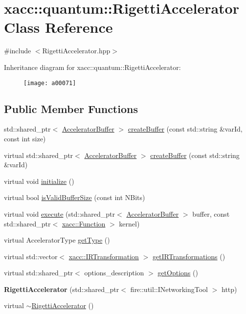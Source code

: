 \hypertarget{a00071}{}\section{xacc\+:\+:quantum\+:\+:Rigetti\+Accelerator Class Reference}
\label{a00071}


{\ttfamily \#include $<$Rigetti\+Accelerator.\+hpp$>$}

Inheritance diagram for xacc\+:\+:quantum\+:\+:Rigetti\+Accelerator\+:\begin{figure}[H]
\begin{center}
\leavevmode
\texttt{[image: a00071]}
\end{center}
\end{figure}
\subsection*{Public Member Functions}
\begin{DoxyCompactItemize}
\item 
std\+::shared\+\_\+ptr$<$ \hyperlink{a00013}{Accelerator\+Buffer} $>$ \hyperlink{a00071_a731551c94b1abef40d2cf032e8712df6}{create\+Buffer} (const std\+::string \&var\+Id, const int size)
\item 
virtual std\+::shared\+\_\+ptr$<$ \hyperlink{a00013}{Accelerator\+Buffer} $>$ \hyperlink{a00071_ada3ceb986e51ab5aa721f2a08e083cd6}{create\+Buffer} (const std\+::string \&var\+Id)
\item 
virtual void \hyperlink{a00071_ab8b6af9bb9dcb110201e9ee5cac74b4f}{initialize} ()
\item 
virtual bool \hyperlink{a00071_a61352c07062597aad2393fbeed4cc025}{is\+Valid\+Buffer\+Size} (const int N\+Bits)
\item 
virtual void \hyperlink{a00071_afce7bbd1b0f04300a9920952e9d12ef4}{execute} (std\+::shared\+\_\+ptr$<$ \hyperlink{a00013}{Accelerator\+Buffer} $>$ buffer, const std\+::shared\+\_\+ptr$<$ \hyperlink{a00038}{xacc\+::\+Function} $>$ kernel)
\item 
virtual Accelerator\+Type \hyperlink{a00071_aab0d4674da5273d55407b9ab77cde890}{get\+Type} ()
\item 
virtual std\+::vector$<$ \hyperlink{a00051}{xacc\+::\+I\+R\+Transformation} $>$ \hyperlink{a00071_a443683a1dfb000603c640b2ee303cf66}{get\+I\+R\+Transformations} ()
\item 
virtual std\+::shared\+\_\+ptr$<$ options\+\_\+description $>$ \hyperlink{a00071_a9ee9e62aecbccf193894ca3388676f9f}{get\+Options} ()
\item 
{\bfseries Rigetti\+Accelerator} (std\+::shared\+\_\+ptr$<$ fire\+::util\+::\+I\+Networking\+Tool $>$ http)\hypertarget{a00071_aa92ba39441ec9c261fbddee23a84d6ac}{}\label{a00071_aa92ba39441ec9c261fbddee23a84d6ac}

\item 
virtual \hyperlink{a00071_a7c86895d1c29afa8b7e18476144a3fcf}{$\sim$\+Rigetti\+Accelerator} ()
\end{DoxyCompactItemize}
